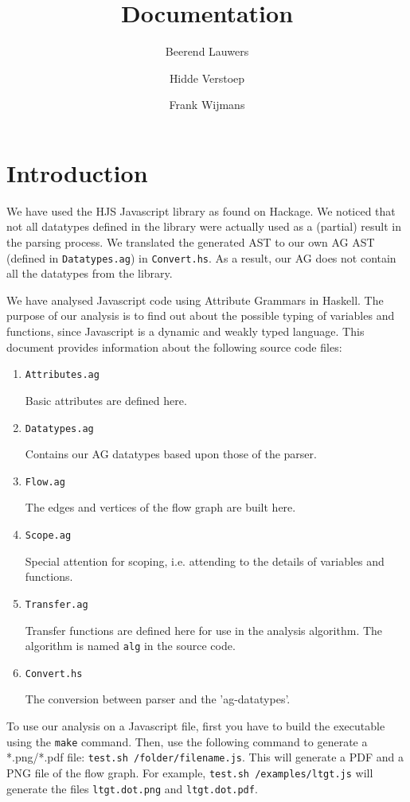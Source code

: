 \documentclass[a4paper,10pt]{article}
\begin{document}
 \title{Documentation}
 \author{Beerend Lauwers \and Hidde Verstoep \and Frank Wijmans}
 \maketitle

 \section{Introduction}
 We have used the HJS Javascript library as found on Hackage. 
 We noticed that not all datatypes defined in the library were actually used as a (partial) result in the parsing process. 
 We translated the generated AST to our own AG AST (defined in \texttt{Datatypes.ag}) in \texttt{Convert.hs}. 
 As a result, our AG does not contain all the datatypes from the library.
 
 We have analysed Javascript code using Attribute Grammars in Haskell.
 The purpose of our analysis is to find out about the possible typing of variables and functions, since Javascript is a dynamic and weakly typed language.
 This document provides information about the following source code files:
 \begin{enumerate}
 	\item \texttt{Attributes.ag} 
 	
 	Basic attributes are defined here.
 	\item \texttt{Datatypes.ag} 
 	
 	Contains our AG datatypes based upon those of the parser.
 	\item \texttt{Flow.ag} 
 	
 	The edges and vertices of the flow graph are built here.
 	\item \texttt{Scope.ag} 
 	
 	Special attention for scoping, i.e. attending to the details of variables and functions.
 	\item \texttt{Transfer.ag} 
 	
 	Transfer functions are defined here for use in the analysis algorithm. The algorithm is named \texttt{alg} in the source code.
 	\item \texttt{Convert.hs} 
 	
 	The conversion between parser and the 'ag-datatypes'.
 \end{enumerate}

 To use our analysis on a Javascript file, first you have to build the executable using the \texttt{make} command.
 Then, use the following command to generate a *.png/*.pdf file: \texttt{test.sh /folder/filename.js}. 
 This will generate a PDF and a PNG file of the flow graph. For example, \texttt{test.sh /examples/ltgt.js} will generate the files \texttt{ltgt.dot.png} and \texttt{ltgt.dot.pdf}.
 
\end{document}

